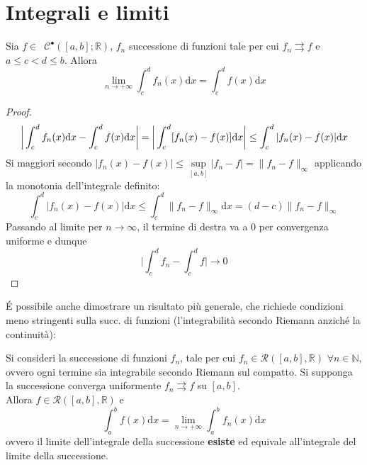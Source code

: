\documentclass[10pt, oneside]{book}
\theoremstyle{plain}
\begin{document}
\section{Integrali e limiti}
\begin{ther}
Sia $f \in \enspace \mathcal{C}^{•}([a,b] ; \mathbb{R})$, $f_n$ successione di funzioni tale per cui $f_n \rightrightarrows f$ e $a \leq c < d \leq b$. Allora
\[\lim\limits_{n \rightarrow +\infty} \int_{c}^{d}f_n(x)\textrm{d}x = \int_{c}^{d}f(x)\textrm{d}x\]
\end{ther}
\begin{proof}
\[\bigg{|}\int_{c}^{d}f_n(x)\textrm{d}x - \int_{c}^{d}f(x)\textrm{d}x\bigg{|} = \bigg{|}\int_{c}^{d}[f_n(x) - f(x)]\textrm{d}x\bigg{|} \leq \int_{c}^{d}|f_n(x) - f(x)|\textrm{d}x\]
Si maggiori secondo $|f_n(x) - f(x)| \leq \sup\limits_{[a,b]}|f_n - f| = \|f_n - f\|_\infty$ applicando la monotonia dell'integrale definito:
\[\int_{c}^{d}|f_n(x) - f(x)|\textrm{d}x \leq \int_{c}^{d}\|f_n - f\|_\infty\textrm{d}x = (d - c)\|f_n - f\|_\infty\]
Passando al limite per $n \rightarrow \infty$, il termine di destra va a $0$ per convergenza uniforme e dunque
\[\bigg|\int_{c}^{d} f_n - \int_{c}^{d} f \bigg| \rightarrow 0\]
\end{proof}
\'E possibile anche dimostrare un risultato più generale, che richiede condizioni meno stringenti sulla succ. di funzioni (l'integrabilità secondo Riemann anziché la continuità):
\begin{ther}
Si consideri la successione di funzioni $f_n$, tale per cui $f_n \in \mathcal{R}([a,b], \mathbb{R})$ $\forall n \in \mathbb{N}$, ovvero ogni termine sia integrabile secondo Riemann sul compatto. Si supponga la successione converga uniformente $f_n \rightrightarrows f$ su $[a,b]$.
\\Allora $f \in \mathcal{R}([a,b], \mathbb{R})$ e 
\[\int_{a}^{b}f(x)\textrm{d}x = \lim\limits_{n \rightarrow +\infty} \int_{a}^{b}f_n(x)\textrm{d}x\]
ovvero il limite dell'integrale della successione \textbf{esiste} ed equivale all'integrale del limite della successione.
\end{ther}
\end{document}
